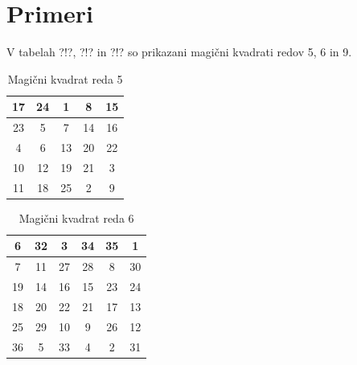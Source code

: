 \documentclass[a4paper,12pt]{article}
\begin{document}

\section{Primeri}

V tabelah ?!?, ?!? in ?!? so prikazani
magični kvadrati redov 5, 6 in 9.


\begin{table}
   \caption{Magični kvadrat reda 5}
   \label{table:mag5}
   \large
   \centering
   \begin{tabular}{|c|c|c|c|c|}
      \hline
      17 & 24 &  1 &  8 & 15 \\\hline
      23 &  5 &  7 & 14 & 16 \\\hline
       4 &  6 & 13 & 20 & 22 \\\hline
      10 & 12 & 19 & 21 &  3 \\\hline
      11 & 18 & 25 &  2 &  9 \\\hline
   \end{tabular}
\end{table}



\begin{table}
   \caption{Magični kvadrat reda 6}
   \label{table:mag6}
   \large
   \centering
   \begin{tabular}{|c|c|c|c|c|c|}
      \hline
      6 & 32 &  3 & 34 & 35 &  1 \\\hline
      7 & 11 & 27 & 28 &  8 & 30 \\\hline
     19 & 14 & 16 & 15 & 23 & 24 \\\hline
     18 & 20 & 22 & 21 & 17 & 13 \\\hline
     25 & 29 & 10 &  9 & 26 & 12 \\\hline
     36 &  5 & 33 &  4 &  2 & 31 \\\hline
   \end{tabular}
\end{table}
\end{document}
